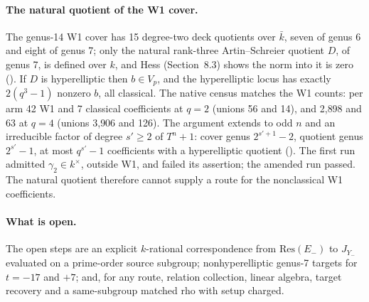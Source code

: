 \paragraph{The natural quotient of the W1 cover.} The genus-14 W1 cover has
15 degree-two deck quotients over $\bar k$, seven of genus 6 and eight of
genus 7; only the natural rank-three Artin--Schreier quotient $D$, of genus 7,
is defined over $k$, and Hess (Section~8.3) shows the norm into it is zero
(). If $D$ is
hyperelliptic then $b\in V_p$, and the hyperelliptic locus has exactly
$2(q^3-1)$ nonzero $b$, all classical. The native census matches the W1
counts: per arm 42 W1 and 7 classical coefficients at $q=2$ (unions 56 and
14), and 2{,}898 and 63 at $q=4$ (unions 3{,}906 and 126). The argument
extends to odd $n$ and an irreducible factor of degree $s'\ge2$ of $T^n+1$:
cover genus $2^{s'+1}-2$, quotient genus $2^{s'}-1$, at most $q^{s'}-1$
coefficients with a hyperelliptic quotient
(). The
first run admitted $\gamma_2\in k^\times$, outside W1, and failed its
assertion; the amended run passed. The natural quotient therefore cannot
supply a route for the nonclassical W1 coefficients.

\paragraph{What is open.} The open steps are an explicit $k$-rational correspondence from
$\mathrm{Res}(E_-)$ to $J_{Y_-}$ evaluated on a prime-order source subgroup;
nonhyperelliptic genus-7 targets for $t=-17$ and $+7$; and, for any route,
relation collection, linear algebra, target recovery and a same-subgroup
matched rho with setup charged.

